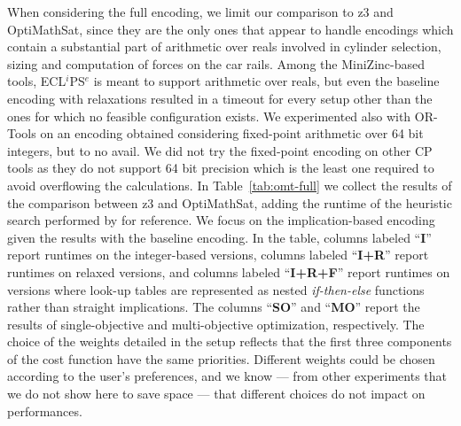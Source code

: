 %
When considering the full encoding, we limit our comparison to 
z3 and OptiMathSat, since they are the only ones that appear to handle
encodings which contain a substantial part of arithmetic over reals
involved in cylinder selection, sizing and computation of forces on
the car rails. Among the MiniZinc-based  
tools, ECL$^i$PS$^e$ is meant to support arithmetic over reals, but
even the baseline encoding with relaxations resulted in a
timeout for every setup other than the ones for which no feasible
configuration exists. We experimented also with OR-Tools on
an encoding obtained considering fixed-point arithmetic over 64 bit
integers, but to no avail. We did not try the fixed-point encoding on
other CP tools as they do not support 64 bit precision which
is the least one required to avoid overflowing the calculations.
In Table~\ref{tab:omt-full} we collect the   
results of the comparison between z3 and OptiMathSat, adding
the runtime of the heuristic search performed by \liftcreate{} for
reference. We focus on the implication-based encoding given the 
results with the baseline encoding. In the table, columns
labeled ``\textbf{I}'' report runtimes on the integer-based versions,
columns labeled ``\textbf{I+R}'' report runtimes on relaxed versions,
and columns  labeled ``\textbf{I+R+F}'' report runtimes on
versions where look-up tables are represented as
nested \emph{if-then-else} functions rather than straight 
implications. The  columns ``\textbf{SO}'' and ``\textbf{MO}'' report
the results of single-objective and multi-objective optimization,
respectively. The choice of the weights detailed in the setup reflects 
that the first three components of the cost function have the same priorities.
Different weights could be chosen according to the user's preferences, 
and we know --- from other experiments that we do not show here to save 
space --- that different choices do not impact on performances.  

